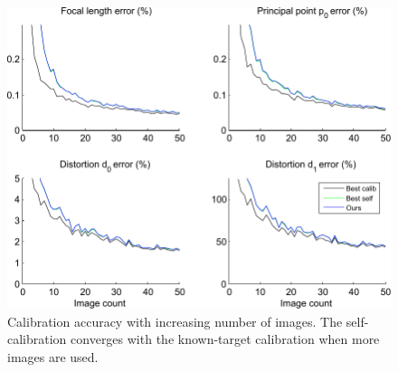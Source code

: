 \documentclass[10pt,twocolumn,letterpaper]{article}
\begin{document}
\begin{figure}
\centering
\includegraphics[width=\linewidth]{images/resultsFrameCount.pdf}
\caption{Calibration accuracy with increasing number of images. The self-calibration converges with the known-target calibration when more images are used.}
\label{fig:results_frames}
\end{figure}

\end{document}

